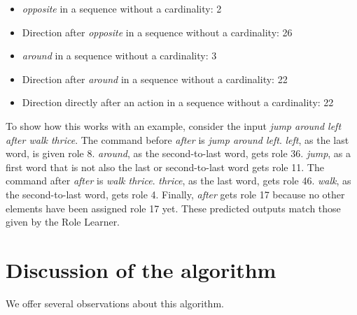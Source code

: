 \begin{itemize}
\begin{itemize}
        \item \textit{opposite} in a sequence without a cardinality: 2
        \item Direction after \textit{opposite} in a sequence without a cardinality: 26
        \item \textit{around} in a sequence without a cardinality: 3
        \item Direction after \textit{around} in a sequence without a cardinality: 22
        \item Direction directly after an action in a sequence without a cardinality: 22
    \end{itemize}
\end{itemize}

\noindent
To show how this works with an example, consider the input \textit{jump around left after walk thrice}. The command before \textit{after} is \textit{jump around left}. \textit{left}, as the last word, is given role 8. \textit{around}, as the second-to-last word, gets role 36. \textit{jump}, as a first word that is not also the last or second-to-last word gets role 11. The command after \textit{after} is \textit{walk thrice}. \textit{thrice}, as the last word, gets role 46. \textit{walk}, as the second-to-last word, gets role 4. Finally, \textit{after} gets role 17 because no other elements have been assigned role 17 yet. These predicted outputs match those given by the Role Learner.

\section{Discussion of the algorithm} \label{sec:AlgDisc}

We offer several observations about this algorithm.

